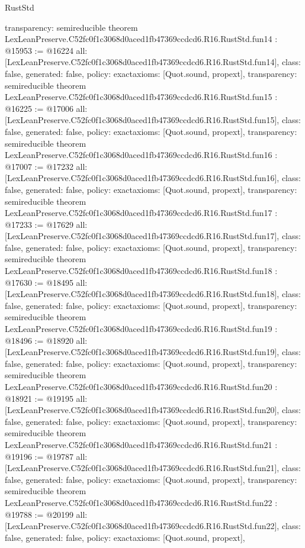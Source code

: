 \begin{lexlean}{RustStd}
\begin{coremodule}
{  transparency: semireducible
}
theorem LexLeanPreserve.C52fc0f1c3068d0aced1fb47369ccdcd6.R16.RustStd.fun14 : @15953 := @16224 {
  all: [LexLeanPreserve.C52fc0f1c3068d0aced1fb47369ccdcd6.R16.RustStd.fun14],
  class: false,
  generated: false,
  policy: exact{axioms: [Quot.sound, propext]},
  transparency: semireducible
}
theorem LexLeanPreserve.C52fc0f1c3068d0aced1fb47369ccdcd6.R16.RustStd.fun15 : @16225 := @17006 {
  all: [LexLeanPreserve.C52fc0f1c3068d0aced1fb47369ccdcd6.R16.RustStd.fun15],
  class: false,
  generated: false,
  policy: exact{axioms: [Quot.sound, propext]},
  transparency: semireducible
}
theorem LexLeanPreserve.C52fc0f1c3068d0aced1fb47369ccdcd6.R16.RustStd.fun16 : @17007 := @17232 {
  all: [LexLeanPreserve.C52fc0f1c3068d0aced1fb47369ccdcd6.R16.RustStd.fun16],
  class: false,
  generated: false,
  policy: exact{axioms: [Quot.sound, propext]},
  transparency: semireducible
}
theorem LexLeanPreserve.C52fc0f1c3068d0aced1fb47369ccdcd6.R16.RustStd.fun17 : @17233 := @17629 {
  all: [LexLeanPreserve.C52fc0f1c3068d0aced1fb47369ccdcd6.R16.RustStd.fun17],
  class: false,
  generated: false,
  policy: exact{axioms: [Quot.sound, propext]},
  transparency: semireducible
}
theorem LexLeanPreserve.C52fc0f1c3068d0aced1fb47369ccdcd6.R16.RustStd.fun18 : @17630 := @18495 {
  all: [LexLeanPreserve.C52fc0f1c3068d0aced1fb47369ccdcd6.R16.RustStd.fun18],
  class: false,
  generated: false,
  policy: exact{axioms: [Quot.sound, propext]},
  transparency: semireducible
}
theorem LexLeanPreserve.C52fc0f1c3068d0aced1fb47369ccdcd6.R16.RustStd.fun19 : @18496 := @18920 {
  all: [LexLeanPreserve.C52fc0f1c3068d0aced1fb47369ccdcd6.R16.RustStd.fun19],
  class: false,
  generated: false,
  policy: exact{axioms: [Quot.sound, propext]},
  transparency: semireducible
}
theorem LexLeanPreserve.C52fc0f1c3068d0aced1fb47369ccdcd6.R16.RustStd.fun20 : @18921 := @19195 {
  all: [LexLeanPreserve.C52fc0f1c3068d0aced1fb47369ccdcd6.R16.RustStd.fun20],
  class: false,
  generated: false,
  policy: exact{axioms: [Quot.sound, propext]},
  transparency: semireducible
}
theorem LexLeanPreserve.C52fc0f1c3068d0aced1fb47369ccdcd6.R16.RustStd.fun21 : @19196 := @19787 {
  all: [LexLeanPreserve.C52fc0f1c3068d0aced1fb47369ccdcd6.R16.RustStd.fun21],
  class: false,
  generated: false,
  policy: exact{axioms: [Quot.sound, propext]},
  transparency: semireducible
}
theorem LexLeanPreserve.C52fc0f1c3068d0aced1fb47369ccdcd6.R16.RustStd.fun22 : @19788 := @20199 {
  all: [LexLeanPreserve.C52fc0f1c3068d0aced1fb47369ccdcd6.R16.RustStd.fun22],
  class: false,
  generated: false,
  policy: exact{axioms: [Quot.sound, propext]},
}
\end{coremodule}
\end{lexlean}
